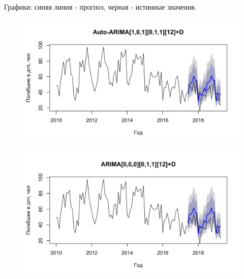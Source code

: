 \documentclass[14pt, a4paper]{extarticle}\usepackage[]{graphicx}\usepackage[]{color}
\makeatletter
\def\maxwidth{ %
  \ifdim\Gin@nat@width>\linewidth
    \linewidth
  \else
    \Gin@nat@width
  \fi
}
\newenvironment{knitrout}{}{} %
\makeatother
\begin{document}
Графики: синяя линия - прогноз, черная - истинные значения. 

\begin{minipage}[t]{0.5\textwidth}
\begin{figure}[H]
\begin{knitrout}
\color{fgcolor}

{\centering \includegraphics[width=\maxwidth]{figure/unnamed-chunk-15-1} 

}



\end{knitrout}
\end{figure}
\end{minipage}

\begin{minipage}[t]{0.5\textwidth}
\begin{figure}[H]
\begin{knitrout}
\color{fgcolor}

{\centering \includegraphics[width=\maxwidth]{figure/unnamed-chunk-16-1} 

}



\end{knitrout}
\end{figure}
\end{minipage}
\end{document}
